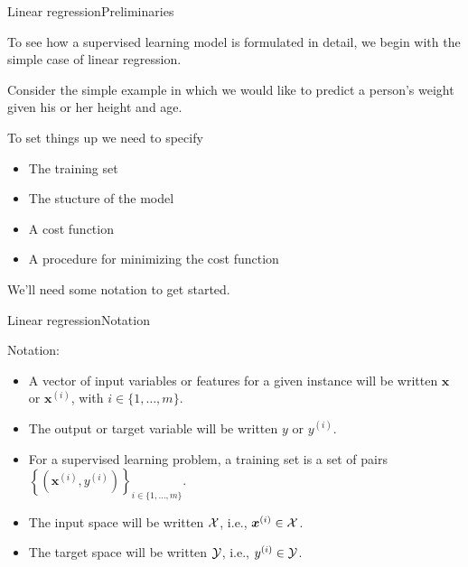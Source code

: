 \documentclass{beamer}
\renewcommand{\vec}[1]{\boldsymbol{#1}}
\begin{document}
\begin{frame}{Linear regression}{Preliminaries}

  To see how a supervised learning model is formulated in detail, we
  begin with the simple case of \alert{linear regression}.

  \medskip
  
  Consider the simple example in which we would like to \alert{predict
    a person's weight} given his or her \alert{height} and
  \alert{age}.

  \medskip

  To set things up we need to specify
  \begin{itemize}
  \item The training set
  \item The stucture of the model
  \item A cost function
  \item A procedure for minimizing the cost function
  \end{itemize}

  \medskip

  We'll need some notation to get started.
  
\end{frame}


\begin{frame}{Linear regression}{Notation}

  Notation:
  \begin{itemize}
  \item A vector of input variables or \alert{features} for a given
    instance will be written $\vec{x}$ or $\vec{x}^{(i)}$, with $i \in
    \{1, \ldots, m\}$.
  \item The output or \alert{target} variable will be written $y$ or
    $y^{(i)}$.
  \item For a supervised learning problem, a \alert{training set} is a
    set of \alert{pairs} $\left\{(\vec{x}^{(i)},y^{(i)})\right\}_{i
      \in \{ 1, \ldots, m \}}$.
  \item The input space will be written ${\cal X}$, i.e.,
    $\vec{x}^{(i)} \in {\cal X}$.
  \item The target space will be written ${\cal Y}$, i.e.,
    $y^{(i)} \in {\cal Y}$.
  \end{itemize}

\end{frame}
\end{document}
